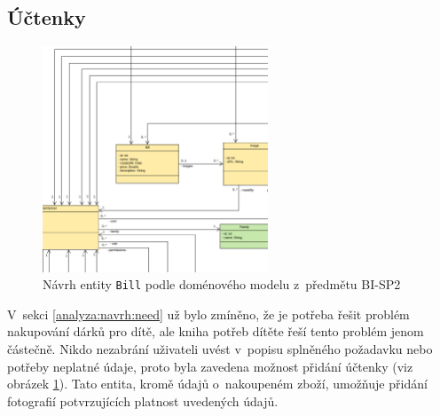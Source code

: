     \subsection{Účtenky}
        \begin{figure}\centering
	        \includegraphics[width=0.6\textwidth]{pdfs/Bill1}
	        \caption[Návrh entity \texttt{Bill}]{Návrh entity \texttt{Bill} podle doménového modelu z~předmětu BI-SP2}\label{image:bill1}
        \end{figure}
        V~sekci \ref{analyza:navrh:need} už bylo zmíněno, že je potřeba řešit problém nakupování dárků pro dítě, ale kniha potřeb dítěte řeší tento problém jenom částečně. Nikdo nezabrání uživateli uvést v~popisu splněného požadavku nebo potřeby neplatné údaje, proto byla zavedena možnost přidání účtenky (viz obrázek \ref{image:bill1}). Tato entita, kromě údajů o~nakoupeném zboží, umožňuje přidání fotografií potvrzujících platnost uvedených údajů.
    
